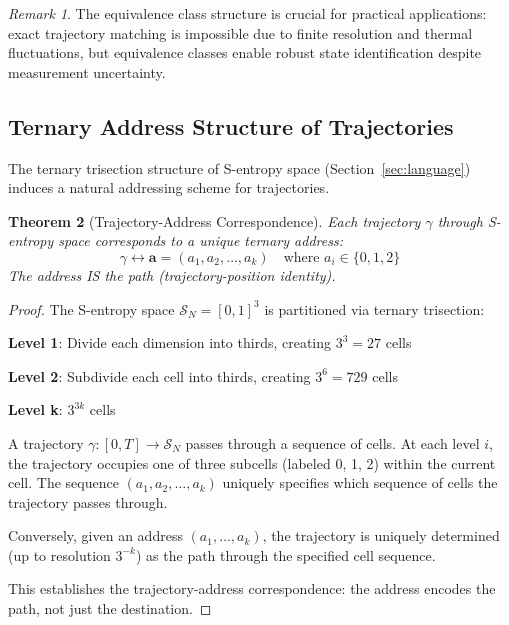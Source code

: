 \documentclass[aps,prd,twocolumn,superscriptaddress,floatfix,nofootinbib]{revtex4-2}
\newtheorem{theorem}{Theorem}[section]
\theoremstyle{remark}
\newtheorem{remark}[theorem]{Remark}
\begin{document}
\begin{remark}
The equivalence class structure is crucial for practical applications: exact trajectory matching is impossible due to finite resolution and thermal fluctuations, but equivalence classes enable robust state identification despite measurement uncertainty.
\end{remark}

\subsection{Ternary Address Structure of Trajectories}

The ternary trisection structure of S-entropy space (Section~\ref{sec:language}) induces a natural addressing scheme for trajectories.

\begin{theorem}[Trajectory-Address Correspondence]
\label{thm:trajectory_address}
Each trajectory $\gamma$ through S-entropy space corresponds to a unique ternary address:
\begin{equation}
\gamma \leftrightarrow \mathbf{a} = (a_1, a_2, \ldots, a_k) \quad \text{where } a_i \in \{0, 1, 2\}
\end{equation}
The address IS the path (trajectory-position identity).
\end{theorem}

\begin{proof}
The S-entropy space $\mathcal{S}_N = [0,1]^3$ is partitioned via ternary trisection:

\textbf{Level 1}: Divide each dimension into thirds, creating $3^3 = 27$ cells

\textbf{Level 2}: Subdivide each cell into thirds, creating $3^6 = 729$ cells

\textbf{Level k}: $3^{3k}$ cells

A trajectory $\gamma: [0,T] \to \mathcal{S}_N$ passes through a sequence of cells. At each level $i$, the trajectory occupies one of three subcells (labeled 0, 1, 2) within the current cell. The sequence $(a_1, a_2, \ldots, a_k)$ uniquely specifies which sequence of cells the trajectory passes through.

Conversely, given an address $(a_1, \ldots, a_k)$, the trajectory is uniquely determined (up to resolution $3^{-k}$) as the path through the specified cell sequence.

This establishes the trajectory-address correspondence: the address encodes the path, not just the destination.
\end{proof}
\end{document}
